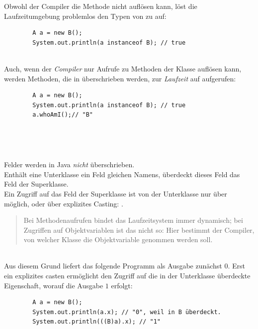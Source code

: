 \begin{tcolorbox}
    Obwohl der Compiler die Methode  nicht auflösen kann, löst die Laufzeitumgebung problemlos den Typen
    von  zu  auf:
    \begin{verbatim}
        A a = new B();
        System.out.println(a instanceof B); // true
    \end{verbatim}\\

    \noindent
    Auch, wenn der \textit{Compiler} nur Aufrufe zu Methoden der Klasse  auflösen kann,
    werden Methoden, die in  überschrieben werden, zur \textit{Laufzeit} auf  aufgerufen:

    \begin{verbatim}
        A a = new B();
        System.out.println(a instanceof B); // true
        a.whoAmI();// "B"
    \end{verbatim}\\

\end{tcolorbox}\\

\begin{tcolorbox}[title={Felder werden überdeckt}]
    Felder werden in Java \textit{nicht} überschrieben.\\
    Enthält eine Unterklasse ein Feld gleichen Namens, überdeckt dieses Feld das Feld der Superklasse.\\
    Ein Zugriff auf das Feld der Superklasse ist von der Unterklasse nur über  möglich, oder über explizites Casting:
    .\\

    \noindent
    \blockquote[{\cite[505]{Ull23}}]{
    Bei Methodenaufrufen bindet das Laufzeitsystem immer dynamisch; bei Zugriffen auf Objektvariablen ist das nicht so: Hier bestimmt der Compiler,
    von welcher Klasse die Objektvariable genommen werden soll.
    }\\

    \noindent
    Aus diesem Grund liefert das folgende Programm als Ausgabe zunächst $0$.
    Erst ein explizites casten ermöglicht den Zugriff auf die in der Unterklasse überdeckte Eigenschaft, worauf die Ausgabe $1$ erfolgt:

    \begin{verbatim}
        A a = new B();
        System.out.println(a.x); // "0", weil in B überdeckt.
        System.out.println(((B)a).x); // "1"
    \end{verbatim}

\end{tcolorbox}

